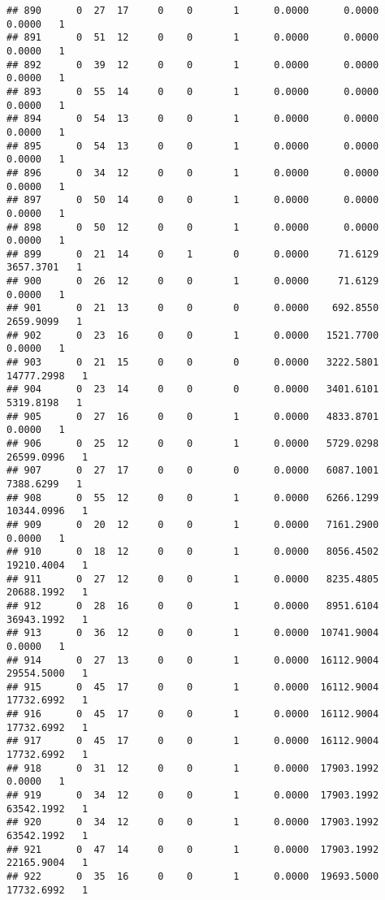 \documentclass[
]{article}
\begin{document}
\begin{enumerate}
\begin{verbatim}
## 890      0  27  17     0    0       1      0.0000      0.0000      0.0000   1
## 891      0  51  12     0    0       1      0.0000      0.0000      0.0000   1
## 892      0  39  12     0    0       1      0.0000      0.0000      0.0000   1
## 893      0  55  14     0    0       1      0.0000      0.0000      0.0000   1
## 894      0  54  13     0    0       1      0.0000      0.0000      0.0000   1
## 895      0  54  13     0    0       1      0.0000      0.0000      0.0000   1
## 896      0  34  12     0    0       1      0.0000      0.0000      0.0000   1
## 897      0  50  14     0    0       1      0.0000      0.0000      0.0000   1
## 898      0  50  12     0    0       1      0.0000      0.0000      0.0000   1
## 899      0  21  14     0    1       0      0.0000     71.6129   3657.3701   1
## 900      0  26  12     0    0       1      0.0000     71.6129      0.0000   1
## 901      0  21  13     0    0       0      0.0000    692.8550   2659.9099   1
## 902      0  23  16     0    0       1      0.0000   1521.7700      0.0000   1
## 903      0  21  15     0    0       0      0.0000   3222.5801  14777.2998   1
## 904      0  23  14     0    0       0      0.0000   3401.6101   5319.8198   1
## 905      0  27  16     0    0       1      0.0000   4833.8701      0.0000   1
## 906      0  25  12     0    0       1      0.0000   5729.0298  26599.0996   1
## 907      0  27  17     0    0       0      0.0000   6087.1001   7388.6299   1
## 908      0  55  12     0    0       1      0.0000   6266.1299  10344.0996   1
## 909      0  20  12     0    0       1      0.0000   7161.2900      0.0000   1
## 910      0  18  12     0    0       1      0.0000   8056.4502  19210.4004   1
## 911      0  27  12     0    0       1      0.0000   8235.4805  20688.1992   1
## 912      0  28  16     0    0       1      0.0000   8951.6104  36943.1992   1
## 913      0  36  12     0    0       1      0.0000  10741.9004      0.0000   1
## 914      0  27  13     0    0       1      0.0000  16112.9004  29554.5000   1
## 915      0  45  17     0    0       1      0.0000  16112.9004  17732.6992   1
## 916      0  45  17     0    0       1      0.0000  16112.9004  17732.6992   1
## 917      0  45  17     0    0       1      0.0000  16112.9004  17732.6992   1
## 918      0  31  12     0    0       1      0.0000  17903.1992      0.0000   1
## 919      0  34  12     0    0       1      0.0000  17903.1992  63542.1992   1
## 920      0  34  12     0    0       1      0.0000  17903.1992  63542.1992   1
## 921      0  47  14     0    0       1      0.0000  17903.1992  22165.9004   1
## 922      0  35  16     0    0       1      0.0000  19693.5000  17732.6992   1

\end{verbatim}
\end{enumerate}
\end{document}
